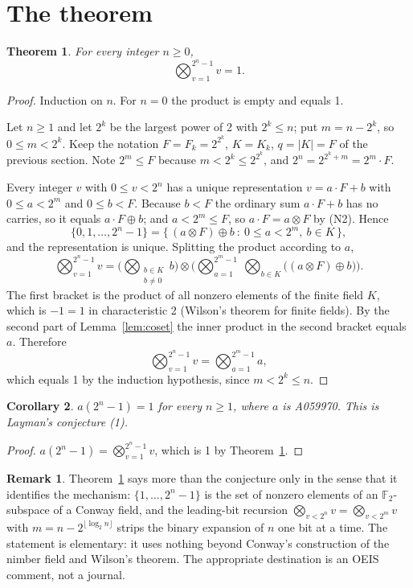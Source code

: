 \documentclass[11pt,a4paper]{article}
\theoremstyle{plain}
\newtheorem{theorem}{Theorem}
\newtheorem{corollary}[theorem]{Corollary}
\theoremstyle{definition}
\newtheorem*{remark}{Remark}
\begin{document}
\section{The theorem}

\begin{theorem}\label{thm:main}
For every integer $n\ge0$,
\[
  \bigotimes_{v=1}^{2^{n}-1}v=1.
\]
\end{theorem}

\begin{proof}
Induction on $n$. For $n=0$ the product is empty and equals 1.

Let $n\ge1$ and let $2^{k}$ be the largest power of 2 with $2^{k}\le n$; put $m=n-2^{k}$,
so $0\le m<2^{k}$. Keep the notation $F=F_{k}=2^{2^{k}}$, $K=K_{k}$, $q=|K|=F$ of the
previous section. Note $2^{m}\le F$ because $m<2^{k}\le2^{2^{k}}$, and
$2^{n}=2^{2^{k}+m}=2^{m}\cdot F$.

Every integer $v$ with $0\le v<2^{n}$ has a unique representation $v=a\cdot F+b$ with
$0\le a<2^{m}$ and $0\le b<F$. Because $b<F$ the ordinary sum $a\cdot F+b$ has no carries,
so it equals $a\cdot F\oplus b$; and $a<2^{m}\le F$, so $a\cdot F=a\otimes F$ by (N2).
Hence
\[
  \{0,1,\dots,2^{n}-1\}=\bigl\{\,(a\otimes F)\oplus b\ :\ 0\le a<2^{m},\ b\in K\,\bigr\},
\]
and the representation is unique. Splitting the product according to $a$,
\[
  \bigotimes_{v=1}^{2^{n}-1}v
  =\Biggl(\bigotimes_{\substack{b\in K\\ b\ne0}}b\Biggr)\otimes
   \Biggl(\bigotimes_{a=1}^{2^{m}-1}\ \bigotimes_{b\in K}
   \bigl((a\otimes F)\oplus b\bigr)\Biggr).
\]
The first bracket is the product of all nonzero elements of the finite field $K$, which is
$-1=1$ in characteristic 2 (Wilson's theorem for finite fields). By the second part of
Lemma~\ref{lem:coset} the inner product in the second bracket equals $a$. Therefore
\[
  \bigotimes_{v=1}^{2^{n}-1}v=\bigotimes_{a=1}^{2^{m}-1}a,
\]
which equals 1 by the induction hypothesis, since $m<2^{k}\le n$.
\end{proof}

\begin{corollary}
$a(2^{n}-1)=1$ for every $n\ge1$, where $a$ is A059970. This is Layman's conjecture (1).
\end{corollary}

\begin{proof}
$a(2^{n}-1)=\bigotimes_{v=1}^{2^{n}-1}v$, which is 1 by Theorem~\ref{thm:main}.
\end{proof}

\begin{remark}
Theorem~\ref{thm:main} says more than the conjecture only in the sense that it identifies
the mechanism: $\{1,\dots,2^{n}-1\}$ is the set of nonzero elements of an
$\mathbb{F}_{2}$-subspace of a Conway field, and the leading-bit recursion
$\bigotimes_{v<2^{n}}v=\bigotimes_{v<2^{m}}v$ with $m=n-2^{\lfloor\log_{2}n\rfloor}$ strips
the binary expansion of $n$ one bit at a time. The statement is elementary: it uses nothing
beyond Conway's construction of the nimber field and Wilson's theorem. The appropriate
destination is an OEIS comment, not a journal.
\end{remark}
\end{document}
